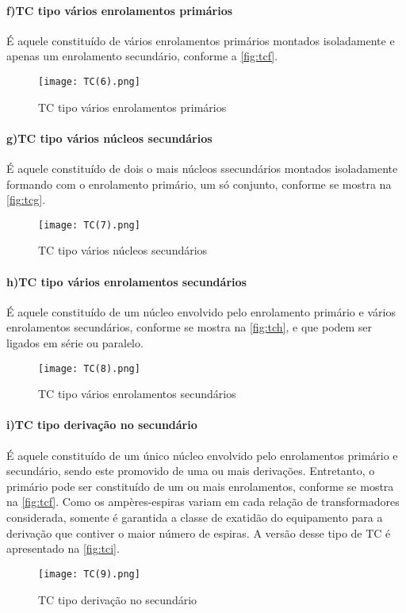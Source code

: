 				\paragraph*{f)\indent TC tipo vários enrolamentos primários}
					É aquele constituído de vários enrolamentos primários montados isoladamente e apenas um enrolamento secundário, conforme a \autoref{fig:tcf}.
					\begin{figure}[htb]
						\caption{TC tipo vários enrolamentos primários}
						\centering
						\texttt{[image: TC(6).png]}
						\label{fig:tcf}
					\end{figure}
				\paragraph*{g)\indent TC tipo vários núcleos secundários}
					É aquele constituído de dois o mais núcleos ssecundários montados isoladamente formando com o enrolamento primário, um só conjunto, conforme se mostra na \autoref{fig:tcg}.
					\begin{figure}[htb]
						\caption{TC tipo vários núcleos secundários}
						\centering
						\texttt{[image: TC(7).png]}
						\label{fig:tcg}
					\end{figure}
				\paragraph*{h)\indent TC tipo vários enrolamentos secundários}
					É aquele constituído de um núcleo envolvido pelo enrolamento primário e vários enrolamentos secundários, conforme se mostra na \autoref{fig:tch}, e que podem ser ligados em série ou paralelo.
					\begin{figure}[htb]
						\caption{TC tipo vários enrolamentos secundários}
						\centering
						\texttt{[image: TC(8).png]}
						\label{fig:tch}
					\end{figure}
				\paragraph*{i)\indent TC tipo derivação no secundário}
					É aquele constituído de um único núcleo envolvido pelo enrolamentos primário e secundário, sendo este promovido de uma ou mais derivações. Entretanto, o primário pode ser constituído de um ou mais enrolamentos, conforme se mostra na \autoref{fig:tcf}. Como os ampères-espiras variam em cada relação de transformadores considerada, somente é garantida a classe de  exatidão do equipamento para a derivação que contiver o maior número de espiras. A versão desse tipo de TC é apresentado na \autoref{fig:tci}.  
					\begin{figure}[htb]
						\caption{TC tipo derivação no secundário}
						\centering
						\texttt{[image: TC(9).png]}
						\label{fig:tci}
					\end{figure}
